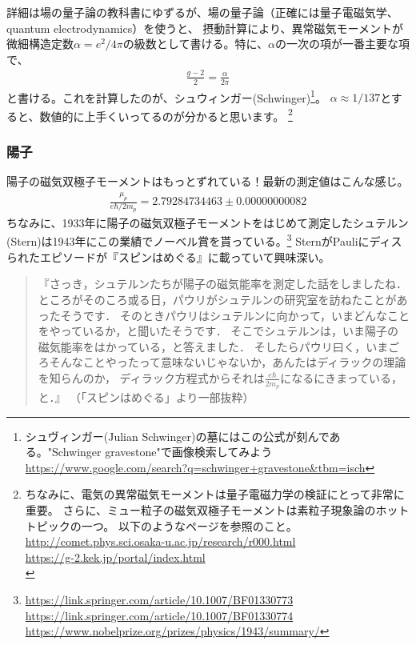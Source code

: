 \documentclass[10pt,a4paper]{jarticle}
\begin{document}
詳細は場の量子論の教科書にゆずるが、場の量子論（正確には量子電磁気学、quantum electrodynamics）を使うと、
摂動計算により、異常磁気モーメントが微細構造定数$\alpha = e^2/4\pi$の級数として書ける。特に、$\alpha$の一次の項が一番主要な項で、
\begin{align}
\frac{g-2}{2} = \frac{\alpha}{2\pi}
\end{align}
と書ける。これを計算したのが、シュウィンガー(Schwinger)\cite{Schwinger:1948iu}\footnote{
シュヴィンガー(Julian Schwinger)の墓にはこの公式が刻んである。"Schwinger gravestone"で画像検索してみよう
\url{https://www.google.com/search?q=schwinger+gravestone&tbm=isch}}。
$\alpha \approx 1/137$とすると、数値的に上手くいってるのが分かると思います。
\footnote{
ちなみに、電気の異常磁気モーメントは量子電磁力学の検証にとって非常に重要。
さらに、ミュー粒子の磁気双極子モーメントは素粒子現象論のホットトピックの一つ\cite{muong-2}。
以下のようなページを参照のこと。\\
\url{http://comet.phys.sci.osaka-u.ac.jp/research/r000.html}\\
\url{https://g-2.kek.jp/portal/index.html}\\}

\subsubsection{陽子}
陽子の磁気双極子モーメントはもっとずれている！最新の測定値はこんな感じ。
\begin{align}
\frac{\mu_p}{e\hbar/2m_p} = 2.79284734463 \pm 0.00000000082
\end{align}
ちなみに、1933年に陽子の磁気双極子モーメントをはじめて測定したシュテルン(Stern)は1943年にこの業績でノーベル賞を貰っている。\footnote{
\url{https://link.springer.com/article/10.1007/BF01330773}\\
\url{https://link.springer.com/article/10.1007/BF01330774}\\
\url{https://www.nobelprize.org/prizes/physics/1943/summary/}
}
SternがPauliにディスられたエピソードが『スピンはめぐる』に載っていて興味深い。
\begin{quote}
『さっき，シュテルンたちが陽子の磁気能率を測定した話をしましたね．
ところがそのころ或る日，パウリがシュテルンの研究室を訪ねたことがあったそうです．
そのときパウリはシュテルンに向かって，いまどんなことをやっているか，と聞いたそうです．
そこでシュテルンは，いま陽子の磁気能率をはかっている，と答えました．
そしたらパウリ曰く，いまごろそんなことやったって意味ないじゃないか，あんたはディラックの理論を知らんのか，
ディラック方程式からそれは$\displaystyle\frac{e\hbar}{2m_p}$になるにきまっている，と．』
（「スピンはめぐる」より一部抜粋）
\end{quote}
\end{document}
